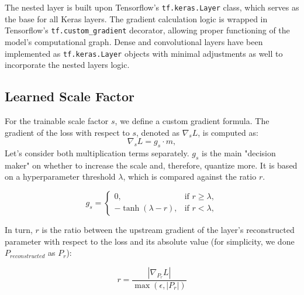 \noindent The nested layer is built upon Tensorflow's \texttt{tf.keras.Layer} class,
which serves as the base for all Keras layers. The gradient calculation logic is wrapped
in Tensorflow's \texttt{tf.custom\_gradient} decorator, allowing proper functioning of the 
model's computational graph. Dense and convolutional layers have been implemented as 
\texttt{tf.keras.Layer} objects with minimal adjustments as well to incorporate the nested layers logic.


\subsection{Learned Scale Factor}
\label{subsec:learnedscalefactor}

For the trainable scale factor \( s \), we define a custom gradient formula. 
The gradient of the loss with respect to \( s \), denoted as \( \nabla_s L \), is computed as:
\[
\nabla_s L = g_s \cdot m,
\]
Let's consider both multiplication terms separately. \(  g_s  \) is the main "decision maker" on whether to
increase the scale and, therefore, quantize more. It is based on a hyperparameter threshold  \(  \lambda  \),
which is compared against the ratio \(  r  \).

\[
g_s = 
\begin{cases} 
0, & \text{if } r \geq \lambda, \\
- \tanh(\lambda - r), & \text{if } r < \lambda,
\end{cases}
\]

\noindent In turn, \(  r  \) is the ratio between the upstream gradient of the layer's reconstructed parameter with respect to the loss
and its absolute value (for simplicity, we done \( P_{reconstructed}\) as \(P_r\)):

\[
r = \frac{\left| \nabla_{P_{r}} L \right|}{\max(\epsilon, \left| P_r \right|)}
\]

